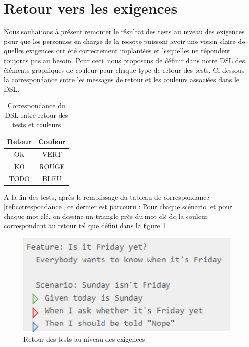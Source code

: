 \section{Retour vers les exigences}

Nous souhaitons à présent remonter le résultat des tests au niveau des exigences pour que les personnes en charge de la recette puissent avoir une vision claire de quelles exigences ont été correctement implantées et lesquelles ne répondent toujours pas au besoin. Pour ceci, nous proposons de définir dans notre DSL des éléments graphiques de couleur pour chaque type de retour des tests. Ci-dessous la correspondance entre les messages de retour et les couleurs associées dans le DSL.

        \begin{table}[H]
        \centering
         \begin{tabular}{|c|c|} 
         \hline
        Retour & Couleur \\ [0.5ex] 
         \hline
          OK &  \cellcolor[HTML]{699A73}VERT\\
         \hline
          KO & \cellcolor[HTML]{D03737} ROUGE \\
         \hline
         TODO & \cellcolor[HTML]{4BB5C1}BLEU \\
         \hline
        \end{tabular}
        \caption{Correspondance du DSL entre retour des tests et couleurs}
        \end{table}

A la fin des tests, après le remplissage du tableau de correspondance \ref{ref:correspondance}, ce dernier est parcouru : 
Pour chaque scénario, et pour chaque mot clé, on dessine un triangle près du mot clé de la couleur correspondant au retour tel que défini dans la figure \ref{ref:colors}

            \begin{figure}[H]
                \centering
                \includegraphics[width=\textwidth]{images/dslReturn.png}
                \caption{Retour des tests au niveau des exigences}
                \label{ref:colors}
            \end{figure}
            
